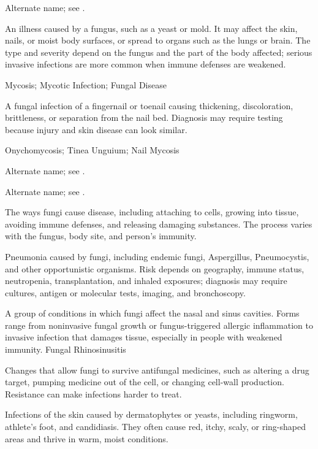  Alternate name; see .

 An illness caused by a fungus, such as a yeast or mold. It may affect the skin, nails, or moist body surfaces, or spread to organs such as the lungs or brain. The type and severity depend on the fungus and the part of the body affected; serious invasive infections are more common when immune defenses are weakened.

\synonyms
Mycosis; Mycotic Infection; Fungal Disease

 A fungal infection of a fingernail or toenail causing thickening, discoloration, brittleness, or separation from the nail bed. Diagnosis may require testing because injury and skin disease can look similar.

\synonyms
Onychomycosis; Tinea Unguium; Nail Mycosis

 Alternate name; see .

 Alternate name; see .

 The ways fungi cause disease, including attaching to cells, growing into tissue, avoiding immune defenses, and releasing damaging substances. The process varies with the fungus, body site, and person’s immunity.

 Pneumonia caused by fungi, including endemic fungi, Aspergillus, Pneumocystis, and other opportunistic organisms. Risk depends on geography, immune status, neutropenia, transplantation, and inhaled exposures; diagnosis may require cultures, antigen or molecular tests, imaging, and bronchoscopy.

 A group of conditions in which fungi affect the nasal and sinus cavities. Forms range from noninvasive fungal growth or fungus-triggered allergic inflammation to invasive infection that damages tissue, especially in people with weakened immunity.
\synonyms
Fungal Rhinosinusitis

 Changes that allow fungi to survive antifungal medicines, such as altering a drug target, pumping medicine out of the cell, or changing cell-wall production. Resistance can make infections harder to treat.

 Infections of the skin caused by dermatophytes or yeasts, including ringworm, athlete’s foot, and candidiasis. They often cause red, itchy, scaly, or ring-shaped areas and thrive in warm, moist conditions.

